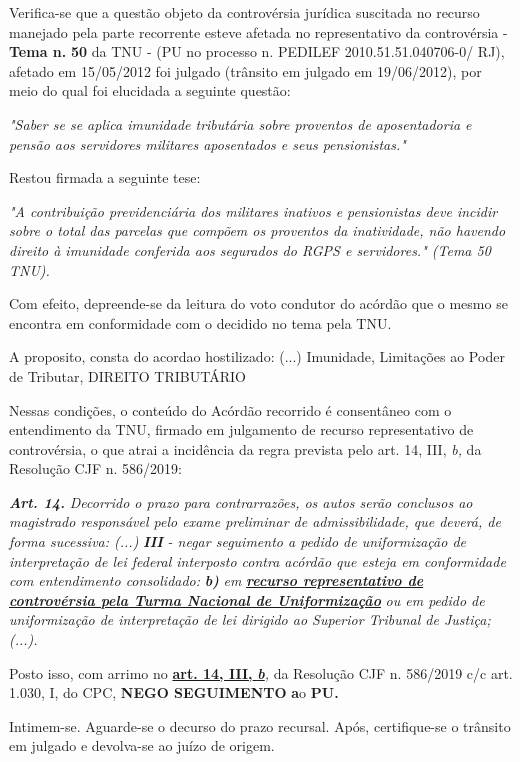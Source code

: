 \documentclass[12pt]{article}
\begin{document}
\justifying
\noindent Verifica-se que a questão objeto da controvérsia jurídica suscitada no recurso manejado pela parte recorrente esteve afetada no representativo da controvérsia - \textbf{Tema n. }\textbf{50} da TNU - (PU no processo n. PEDILEF 2010.51.51.040706-0/ RJ),  afetado em 15/05/2012 foi julgado (trânsito em julgado em 19/06/2012), por meio do qual foi elucidada a seguinte questão:

\noindent \textit{"Saber se se aplica imunidade tributária sobre proventos de aposentadoria e pensão aos servidores militares aposentados e seus pensionistas."}

\noindent Restou firmada a seguinte tese:

\noindent \textit{"A contribuição previdenciária dos militares inativos e pensionistas deve incidir sobre o total das parcelas que compõem os proventos da inatividade, não havendo direito à imunidade conferida aos segurados do RGPS e servidores." (Tema 50 TNU).}

\noindent Com efeito, depreende-se da leitura do voto condutor do acórdão que o mesmo se encontra em conformidade com o decidido no  tema pela TNU.

\noindent A proposito, consta do acordao hostilizado: (...) Imunidade, Limitações ao Poder de Tributar, DIREITO TRIBUTÁRIO

\noindent Nessas condições, o conteúdo do Acórdão recorrido é consentâneo com o entendimento da TNU, firmado em julgamento de recurso representativo de controvérsia, o que atrai a incidência da regra prevista pelo art. 14, III, \textit{b,} da Resolução CJF n. 586/2019:

\noindent \textit{\textbf{Art. 14.}}\textit{ Decorrido o prazo para contrarrazões, os autos serão conclusos ao magistrado responsável pelo exame preliminar de admissibilidade, que deverá, de forma sucessiva: (...) }\textit{\textbf{III }}\textit{- negar seguimento a pedido de uniformização de interpretação de lei federal interposto contra acórdão que esteja em conformidade com entendimento consolidado: }\textit{\textbf{b)}}\textit{ em }\uline{\textit{\textbf{recurso representativo de controvérsia pela Turma Nacional de Uniformização}}}\textit{ ou em pedido de uniformização de interpretação de lei dirigido ao Superior Tribunal de Justiça;(...).}

\noindent Posto isso, com arrimo no \uline{\textbf{art. 14, III, }}\uline{\textit{\textbf{b}}}\textit{,} da Resolução CJF n. 586/2019 c/c art. 1.030, I, do CPC, \textbf{NEGO SEGUIMENTO }\textbf{a}o\textbf{ PU}\textbf{.}

\noindent Intimem-se. Aguarde-se o decurso do prazo recursal. Após, certifique-se o trânsito em julgado e devolva-se ao juízo de origem.
\end{document}
